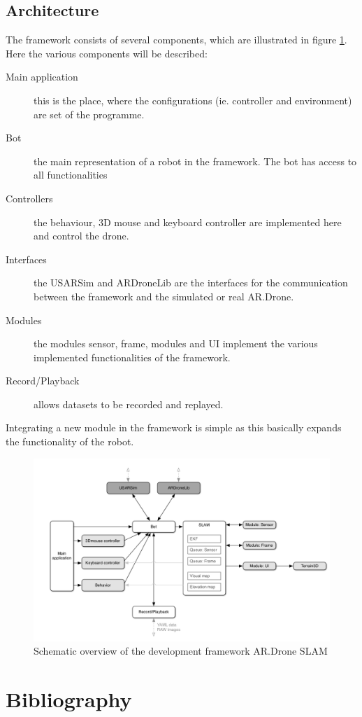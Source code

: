 \documentclass[a4paper]{article}
\begin{document}
\begin{appendices}
\subsection{Architecture}
The framework consists of several components, which are illustrated in figure \ref{frameworknick}. Here the various components will be described:
\begin{description}
\item[Main application] this is the place, where the configurations (ie. controller and environment) are set of the programme.
\item[Bot] the main representation of a robot in the framework. The bot has access to all functionalities
\item[Controllers] the behaviour, 3D mouse and keyboard controller are implemented here and control the drone.
\item[Interfaces] the USARSim and ARDroneLib are the interfaces for the communication between the framework and the simulated or real AR.Drone.
\item[Modules] the modules sensor, frame, modules and UI implement the various implemented functionalities of the framework.
\item[Record/Playback] allows datasets to be recorded and replayed.
\end{description}
Integrating a new module in the framework is simple as this basically expands the functionality of the robot.
\begin{figure}[!ht]
\centering
\includegraphics[width=\textwidth]{images/framework.png}
\caption{Schematic overview \cite{Dijkshoorn2012} of the development framework AR.Drone SLAM}
\label{frameworknick}
\end{figure}
\end{appendices}

\newpage

\section{Bibliography}
\renewcommand{\section}[2]{}


\end{document}
